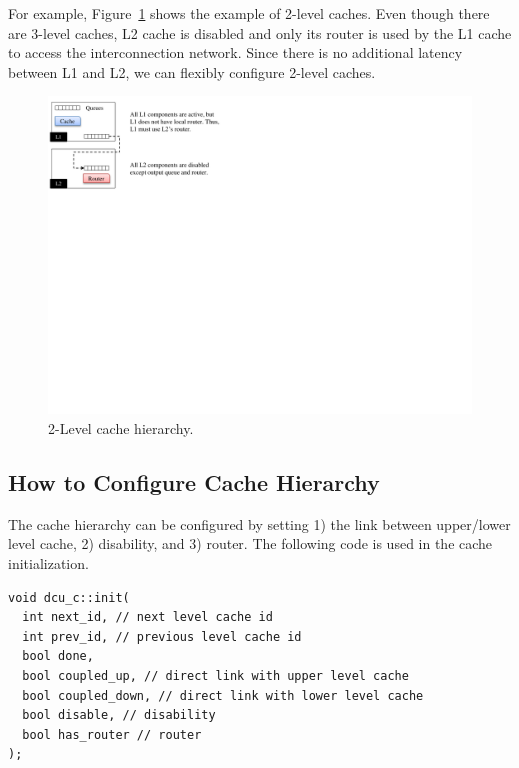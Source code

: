 For example, Figure~\ref{fig:level2cache} shows the example of 2-level
caches. Even though there are 3-level caches, L2 cache is disabled and
only its router is used by the L1 cache to access the interconnection
network. Since there is no additional latency between L1 and L2, we
can flexibly configure 2-level caches.


\begin{figure}[htb]
\centering
\includegraphics{figs/level2cache}
\caption{2-Level cache hierarchy.}
\label{fig:level2cache}
\end{figure}


\subsection{How to Configure Cache Hierarchy} 

The cache hierarchy can be configured by setting 1) the link between
upper/lower level cache, 2) disability, and 3) router. The following
code is used in the \SIM cache initialization.

\smallskip
\begin{lstlisting}
void dcu_c::init(
  int next_id, // next level cache id
  int prev_id, // previous level cache id
  bool done, 
  bool coupled_up, // direct link with upper level cache
  bool coupled_down, // direct link with lower level cache
  bool disable, // disability
  bool has_router // router
);
\end{lstlisting}
\smallskip


